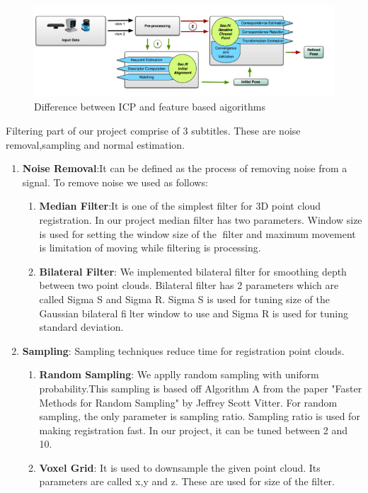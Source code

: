 \documentclass[aps,letterpaper,11pt]{revtex4}
\begin{document}
\begin{figure}[H]
	\centering
	\includegraphics[width=15cm]{icpvsfe.png}
	\caption{Difference between ICP and feature based aigorithms}

\end{figure}


Filtering part of our project comprise of 3 subtitles. These are noise removal,sampling and normal estimation.
\begin{enumerate}
  \item \textbf{Noise Removal}:It can be defined as  the process of removing noise from a signal. To remove noise we used as follows:
\begin{enumerate}
  \item \textbf{Median Filter}:It is one of the simplest filter for 3D point cloud registration. In our project median filter has two parameters. Window size is used for setting the window  size of the filter and maximum movement is  limitation of moving while filtering is processing.
  \item \textbf{Bilateral Filter}: We implemented bilateral filter for smoothing depth between two point clouds. Bilateral filter has 2 parameters which are called Sigma S and Sigma R. Sigma S is used for tuning  size of the Gaussian bilateral filter window to use and Sigma R is used for tuning standard deviation.
\end{enumerate}
\item \textbf{Sampling}: Sampling techniques reduce time for registration point clouds.
\begin{enumerate}
  \item \textbf{Random Sampling}: We applly random sampling with uniform probability.This sampling is based off Algorithm A from the paper "Faster Methods for Random Sampling" by Jeffrey Scott Vitter. For random sampling, the only parameter is sampling ratio. Sampling ratio is used for making registration fast. In our project, it can be tuned between 2 and 10.
  \item \textbf{Voxel Grid}: It is used to downsample the given point cloud. Its parameters are called x,y and z. These are used for size of the filter.

\end{enumerate}
\end{enumerate}
\end{document}
